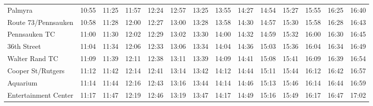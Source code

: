\begin{center}
\begin{tabular}{@{}lrrrrrrrrrrrrr@{}}
Palmyra & 10:55 & 11:25 & 11:57 & 12:24 & 12:57 & 13:25 & 13:55 & 14:27 & 14:54 & 15:27 & 15:55 & 16:25 & 16:40 \\
Route 73/Pennsauken & 10:58 & 11:28 & 12:00 & 12:27 & 13:00 & 13:28 & 13:58 & 14:30 & 14:57 & 15:30 & 15:58 & 16:28 & 16:43 \\
Pennsauken TC & 11:00 & 11:30 & 12:02 & 12:29 & 13:02 & 13:30 & 14:00 & 14:32 & 14:59 & 15:32 & 16:00 & 16:30 & 16:45 \\
36th Street & 11:04 & 11:34 & 12:06 & 12:33 & 13:06 & 13:34 & 14:04 & 14:36 & 15:03 & 15:36 & 16:04 & 16:34 & 16:49 \\
Walter Rand TC & 11:09 & 11:39 & 12:11 & 12:38 & 13:11 & 13:39 & 14:09 & 14:41 & 15:08 & 15:41 & 16:09 & 16:39 & 16:54 \\
Cooper St/Rutgers & 11:12 & 11:42 & 12:14 & 12:41 & 13:14 & 13:42 & 14:12 & 14:44 & 15:11 & 15:44 & 16:12 & 16:42 & 16:57 \\
Aquarium & 11:14 & 11:44 & 12:16 & 12:43 & 13:16 & 13:44 & 14:14 & 14:46 & 15:13 & 15:46 & 16:14 & 16:44 & 16:59 \\
Entertainment Center & 11:17 & 11:47 & 12:19 & 12:46 & 13:19 & 13:47 & 14:17 & 14:49 & 15:16 & 15:49 & 16:17 & 16:47 & 17:02 \\
\bottomrule\end{tabular}\end{center}
